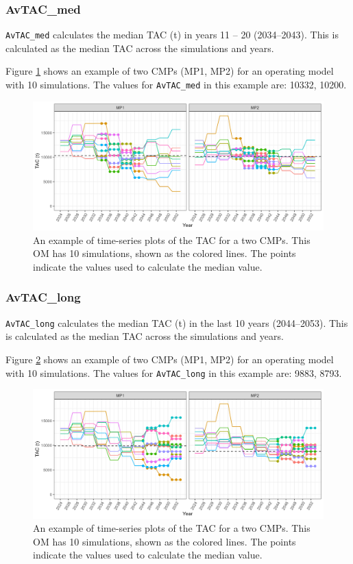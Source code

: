 \documentclass[
]{article}
\begin{document}
\hypertarget{avtac_med}{%
\subsubsection{AvTAC\_med}\label{avtac_med}}

\texttt{AvTAC\_med} calculates the median TAC (t) in years 11 -- 20 (2034--2043). This is calculated as the median TAC across the simulations and years.

Figure \ref{fig:AvCmed} shows an example of two CMPs (MP1, MP2) for an operating model with 10 simulations. The values for \texttt{AvTAC\_med} in this example are: 10332, 10200.

\begin{figure}
\includegraphics[width=37.5in]{../../img/PMs/AvTAC_med} \caption{An example of time-series plots of the TAC for a two CMPs. This OM has 10 simulations, shown as the colored lines. The points indicate the values used to calculate the median value.}\label{fig:AvCmed}
\end{figure}

\hypertarget{avtac_long}{%
\subsubsection{AvTAC\_long}\label{avtac_long}}

\texttt{AvTAC\_long} calculates the median TAC (t) in the last 10 years (2044--2053). This is calculated as the median TAC across the simulations and years.

Figure \ref{fig:AvC30} shows an example of two CMPs (MP1, MP2) for an operating model with 10 simulations. The values for \texttt{AvTAC\_long} in this example are: 9883, 8793.

\begin{figure}
\includegraphics[width=37.5in]{../../img/PMs/AvTAC_long} \caption{An example of time-series plots of the TAC for a two CMPs. This OM has 10 simulations, shown as the colored lines. The points indicate the values used to calculate the median value.}\label{fig:AvC30}
\end{figure}
\end{document}
